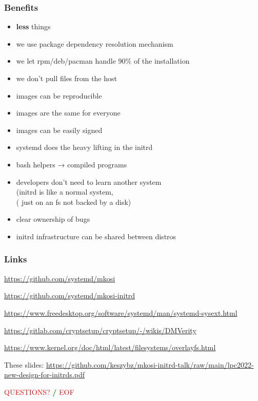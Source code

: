\documentclass[]{beamer}
\newcommand\pp{}
\begin{document}
\begin{frame}
  \frametitle{Benefits}

  \begin{itemize}
  \item \textbf{less} things
    \pp
  \item we use package dependency resolution mechanism
    \pp
  \item we let rpm/deb/pacman handle 90\% of the installation
    \pp
  \item we don't pull files from the host
    \pp
  \item images can be reproducible
    \pp
  \item images are the same for everyone
    \pp
  \item images can be easily signed
    \pp
  \item systemd does the heavy lifting in the initrd
    \pp
  \item bash helpers → compiled programs
    \pp
  \item developers don't need to learn another system\\
    (initrd is like a normal system,\\
    \phantom( just on an fs not backed by a disk)
    \pp
  \item clear ownership of bugs
    \pp
  \item initrd infrastructure can be shared between distros
  \end{itemize}
\end{frame}




\begin{frame}[fragile]
  \frametitle{Links}

  \url{https://github.com/systemd/mkosi}

  \url{https://github.com/systemd/mkosi-initrd}

  \url{https://www.freedesktop.org/software/systemd/man/systemd-sysext.html}

  {
    \small
    \url{https://gitlab.com/cryptsetup/cryptsetup/-/wikis/DMVerity}\\
    }

  \url{https://www.kernel.org/doc/html/latest/filesystems/overlayfs.html}

  \quad

  These slides:
  \url{https://github.com/keszybz/mkosi-initrd-talk/raw/main/lpc2022-new-design-for-initrds.pdf}

  \quad
  \pp

  \hfill \textcolor{red}{QUESTIONS?} \textcolor{green}{\bf /} \textcolor{red}{EOF} \hfill{}

\end{frame}
\end{document}
